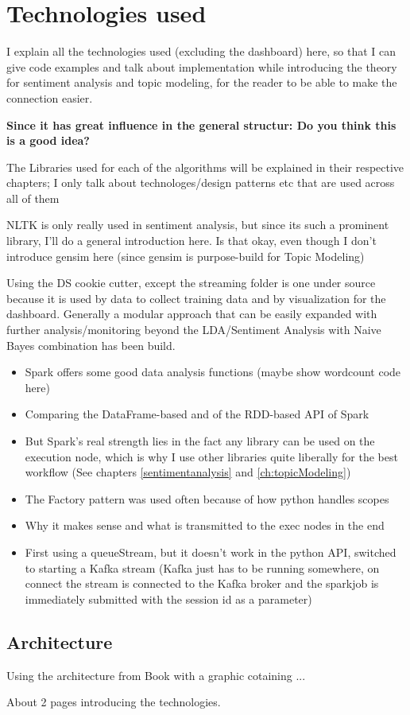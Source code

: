 
\chapter{Technologies used}

\label{ch:technologiesUsed}

I explain all the technologies used (excluding the dashboard) here, so that I can give code examples and talk about implementation
while introducing the theory for sentiment analysis and topic modeling, for the reader to be able to make the connection easier.

\textbf{Since it has great influence in the general structur: Do you think this is a good idea?}

The Libraries used for each of the algorithms will be explained in their respective chapters;
I only talk about technologes/design patterns etc that are used across all of them

NLTK is only really used in sentiment analysis, but since its such a prominent library, I'll do a general introduction here.
Is that okay, even though I don't introduce gensim here (since gensim is purpose-build for Topic Modeling)

Using the DS cookie cutter, except the streaming folder is one under source because it is used by data to collect training data and by visualization for the dashboard.
Generally a modular approach that can be easily expanded with further analysis/monitoring beyond the LDA/Sentiment Analysis with Naive Bayes combination has been build.

\begin{itemize}
    \item
    Spark offers some good data analysis functions (maybe show wordcount code here)
    \item
    Comparing the DataFrame-based and of the RDD-based API of Spark
    \item
    But Spark's real strength lies in the fact any library can be used on the execution node, which is why I use other libraries quite liberally for the best workflow (See chapters \ref{sentimentanalysis} and \ref{ch:topicModeling})
    \item
    The Factory pattern was used often because of how python handles scopes
    \item
    Why it makes sense and what is transmitted to the exec nodes in the end
    \item
    First using a queueStream, but it doesn’t work in the python API, switched to starting a Kafka stream (Kafka just has to be running somewhere, on connect the stream is connected to the Kafka broker and the sparkjob is immediately submitted with the session id as a parameter)


\end{itemize}

\section{Architecture}
\label{sec:architecture}

Using the architecture from Book with a graphic cotaining ...

About 2 pages introducing the technologies.

\pagebreak[2]